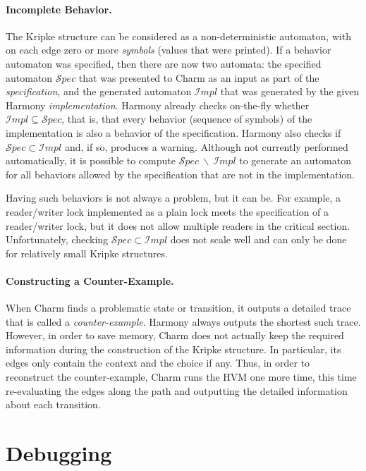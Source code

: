 \documentclass[twocolumn]{article}
\begin{document}
\paragraph{Incomplete Behavior.}

The Kripke structure can be considered as a non-deterministic
automaton, with on each edge zero or more \emph{symbols} (values
that were printed).  If a behavior automaton was specified,
then there are now two automata: the specified automaton
${\mathcal Spec}$ that was presented to Charm as an input as
part of the \emph{specification}, and the generated automaton
${\mathcal Impl}$ that was generated by the given Harmony
\emph{implementation}.  Harmony already checks on-the-fly whether
${\mathcal Impl} \subseteq {\mathcal Spec}$, that is, that every
behavior (sequence of symbols) of the implementation is also a
behavior of the specification.  Harmony also checks if
${\mathcal Spec} \subset {\mathcal Impl}$ and, if so,
produces a warning.
Although not currently performed automatically, it is possible to compute
${\mathcal Spec}~\backslash~{\mathcal Impl}$
to generate an automaton for all behaviors allowed by the
specification that are not in the implementation.

Having such behaviors is not always a problem, but it can be.  For
example, a reader/writer lock implemented as a plain lock meets the
specification of a reader/writer lock, but it does not allow multiple
readers in the critical section.  Unfortunately, checking ${\mathcal
Spec} \subset {\mathcal Impl}$ does not scale well and can only be
done for relatively small Kripke structures.

\paragraph{Constructing a Counter-Example.}

When Charm finds a problematic state or transition, it outputs
a detailed trace that is called a \emph{counter-example}.
Harmony always outputs the shortest such trace.
However, in order to save memory, Charm does not actually keep
the required information during the construction of the Kripke
structure.  In particular, its edges only contain the context
and the choice if any.  Thus, in order to reconstruct the
counter-example, Charm runs the HVM one more time, this time
re-evaluating the edges along the path and outputting the
detailed information about each transition.

\section{Debugging}
\end{document}
